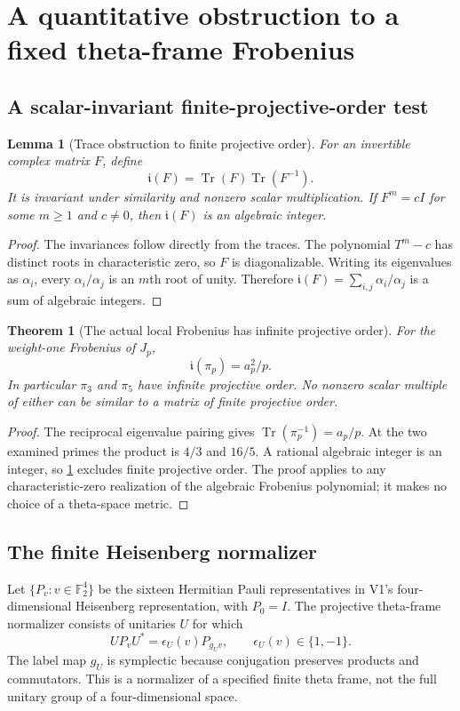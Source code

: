 \documentclass[11pt]{article}
\newtheorem{theorem}{Theorem}[section]
\newtheorem{lemma}[lemma]{Lemma}
\theoremstyle{definition}
\theoremstyle{remark}
\newcommand{\F}{\mathbb F}
\newcommand{\Tr}{\operatorname{Tr}}
\begin{document}
\section{A quantitative obstruction to a fixed theta-frame Frobenius}
\label{sec:v5-normalizer}

\subsection{A scalar-invariant finite-projective-order test}
\begin{lemma}[Trace obstruction to finite projective order]
\label{lem:v5-projective-integrality}
For an invertible complex matrix $F$, define
\[
 \mathfrak i(F)=\Tr(F)\Tr(F^{-1}).
\]
It is invariant under similarity and nonzero scalar multiplication. If
$F^m=cI$ for some $m\ge1$ and $c\ne0$, then $\mathfrak i(F)$ is an
algebraic integer.
\end{lemma}
\begin{proof}
The invariances follow directly from the traces. The polynomial $T^m-c$
has distinct roots in characteristic zero, so $F$ is diagonalizable.
Writing its eigenvalues as $\alpha_i$, every $\alpha_i/\alpha_j$ is an
$m$th root of unity. Therefore
$\mathfrak i(F)=\sum_{i,j}\alpha_i/\alpha_j$ is a sum of algebraic
integers.
\end{proof}

\begin{theorem}[The actual local Frobenius has infinite projective order]
\label{thm:v5-infinite-projective}
For the weight-one Frobenius of $J_p$,
\begin{equation}
 \boxed{\mathfrak i(\pi_p)=a_p^2/p.}
 \label{eq:v5-projective-trace}
\end{equation}
In particular $\pi_3$ and $\pi_5$ have infinite projective order. No
nonzero scalar multiple of either can be similar to a matrix of finite
projective order.
\end{theorem}
\begin{proof}
The reciprocal eigenvalue pairing gives
$\Tr(\pi_p^{-1})=a_p/p$. At the two examined primes the product is $4/3$
and $16/5$. A rational algebraic integer is an integer, so
\cref{lem:v5-projective-integrality} excludes finite projective order.
The proof applies to any characteristic-zero realization of the algebraic
Frobenius polynomial; it makes no choice of a theta-space metric.
\end{proof}

\subsection{The finite Heisenberg normalizer}
Let $\{P_v:v\in\F_2^4\}$ be the sixteen Hermitian Pauli representatives in
V1's four-dimensional Heisenberg representation, with $P_0=I$. The
projective theta-frame normalizer consists of unitaries $U$ for which
\begin{equation}
 UP_vU^*=\epsilon_U(v)P_{g_Uv},\qquad \epsilon_U(v)\in\{1,-1\}.
 \label{eq:v5-Pauli-normalizer}
\end{equation}
The label map $g_U$ is symplectic because conjugation preserves products
and commutators. This is a normalizer of a specified finite theta frame,
not the full unitary group of a four-dimensional space.
\end{document}
